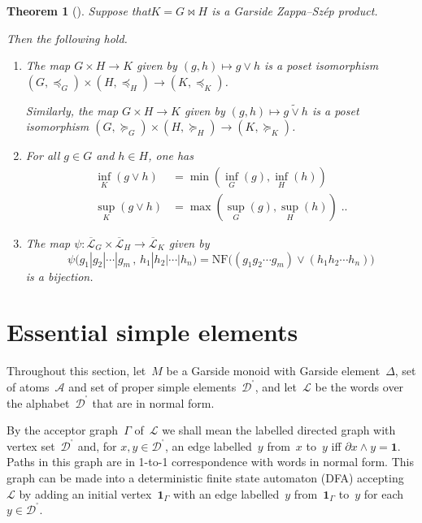 \documentclass[a4paper,final]{article}
\let\zs=\bowtie
\theoremstyle{plain}
\newtheorem{theorem}{Theorem}
\theoremstyle{remark}
\theoremstyle{definition}
\begin{document}
\begin{theorem}[{\cite[Theorem~28, Theorem~38, Corollary~52]{Zappa-Szep}}]\label{T:ZappaSzep}
  Suppose that\linebreak $K = G \zs H$ is a Garside {Zappa--Sz{\'e}p}{} product.
  
  Then the following hold.
  \begin{enumerate} \itemsep 0em \vspace{-0.5\topskip}
   \item
     The map $G \times H \to K$ given by $(g,h) \mapsto g {\vee} h$ is a poset isomorphism
     $(G, {\preccurlyeq}_G)\times(H, {\preccurlyeq}_H) \to (K, {\preccurlyeq}_K)$.

     Similarly, the map $G \times H \to K$ given by $(g,h) \mapsto g {\mathbin{\widetilde{\vee}}} h$ is a poset isomorphism
     $(G, {\succcurlyeq}_G)\times(H, {\succcurlyeq}_H) \to (K, {\succcurlyeq}_K)$.
   \item
     For all $g \in G$ and $h\in H$, one has
     \begin{align*}
       {\inf}_K(g {\vee} h) &= \min({\inf}_G(g), {\inf}_H(h)) \\
        {\sup}_K(g {\vee} h) &= \max({\sup}_G(g), {\sup}_H(h))
        \;..
     \end{align*}
   \item
     The map $\psi {\colon\!} {\overline{\mathcal{L}}}_G \times {\overline{\mathcal{L}}}_H \to {\overline{\mathcal{L}}}_K$ given by
     \[
        \psi\big(g_1 | g_2 | \cdots | g_m \,,\, h_1 | h_2 | \cdots | h_n\big)
          = {\mathrm{NF}}\big( (g_1 g_2 \cdots g_m) {\vee} (h_1 h_2 \cdots h_n) \big)
     \]
     is a bijection.
  \end{enumerate}
\end{theorem}

\section{Essential simple elements}\label{S:Essential}

Throughout this section, let~$M$ be a Garside monoid with Garside element~$\Delta$,
set of atoms~${\mathcal{A}}$ and set of proper simple elements~${{\mathcal{D}}^{\!{}^{\circ}\!}}$, and let~${\mathcal{L}}$ be the words over the alphabet~${{\mathcal{D}}^{\!{}^{\circ}\!}}$ that are in normal form.

By the acceptor graph~${\Gamma}$ of~${\mathcal{L}}$ we shall mean the labelled directed graph
with vertex set~${{\mathcal{D}}^{\!{}^{\circ}\!}}$ and, for $x,y\in{{\mathcal{D}}^{\!{}^{\circ}\!}}$, an edge labelled~$y$ from~$x$ to~$y$ iff
${\partial} x {\wedge} y = {\mathbf{1}}$.  Paths in this graph are in 1-to-1 correspondence with words in normal form.  This graph can be made into a deterministic finite state automaton (DFA) accepting~${\mathcal{L}}$ by adding an initial vertex~${\mathbf{1}}_\Gamma$ with an edge labelled~$y$ from~${\mathbf{1}}_\Gamma$ to~$y$ for each $y\in{{\mathcal{D}}^{\!{}^{\circ}\!}}$.
\end{document}
